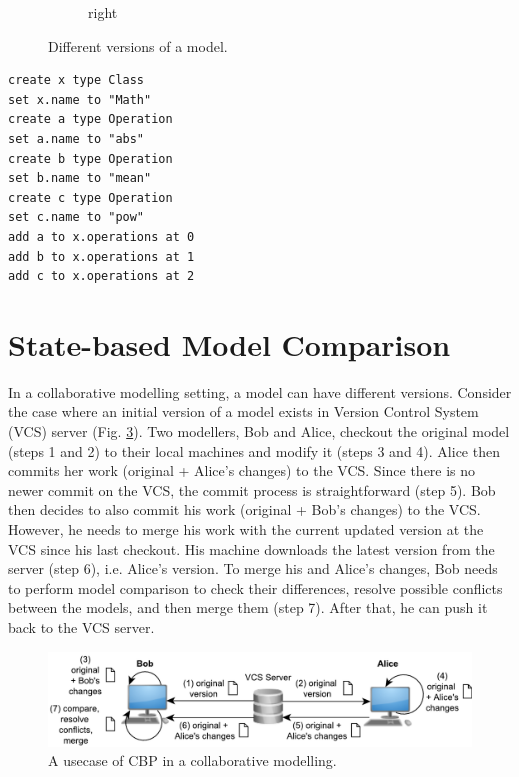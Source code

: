 \documentclass{jot}
\newcommand{\dk}[1]{\textcolor{blue}{\textbf{[Dimitris: #1]}}}
\begin{document}
\begin{minipage}[t]{0.61\linewidth}
\begin{figure}[H]
\begin{subfigure}[t]{0.2\linewidth}
        \caption{right}
        \label{fig:right}
    \end{subfigure}
    \hfill
    \label{fig:versions}
    \caption{Different versions of a model.}
\end{figure}
\end{minipage}
\hfill
\begin{minipage}[t]{0.37\linewidth}
\begin{lstlisting}[style=eol,numbersep=0.6pt,caption={The pseudo-formatted CBP of the model in Fig. \ref{fig:origin}.},label=lst:origincbp]
create x type Class
set x.name to "Math" 
create a type Operation
set a.name to "abs" 
create b type Operation
set b.name to "mean" 
create c type Operation
set c.name to "pow" 
add a to x.operations at 0
add b to x.operations at 1
add c to x.operations at 2
\end{lstlisting}
\end{minipage}

\vspace{-5pt}
\section{State-based Model Comparison}
\label{sec:model_comparison}

\vspace{-5pt}
In a collaborative modelling setting, a model can have different versions.
Consider the case where an initial version of a model exists in Version Control System (VCS) server (Fig. \ref{fig:vcs}).
Two modellers, Bob and Alice, checkout the original model (steps 1 and 2) to their local machines and modify it (steps 3 and 4).
Alice then commits her work (original + Alice's changes) to the VCS.
Since there is no newer commit on the VCS, the commit process is straightforward (step 5).
Bob then decides to also commit his work (original + Bob's changes) to the VCS.
However, he needs to merge his work with the current updated version at the VCS since his last checkout.
His machine downloads the latest version from the server (step 6), i.e. Alice's version.
To merge his and Alice's changes, Bob needs to perform model comparison to check their differences, resolve possible conflicts between the models, and then merge them (step 7).
After that, he can push it back to the VCS server.

\begin{figure}[ht]
    \includegraphics[width=\linewidth]{VCS}
    \caption{A usecase of CBP in a collaborative modelling.}
    \label{fig:vcs}
\end{figure}
\end{document}

